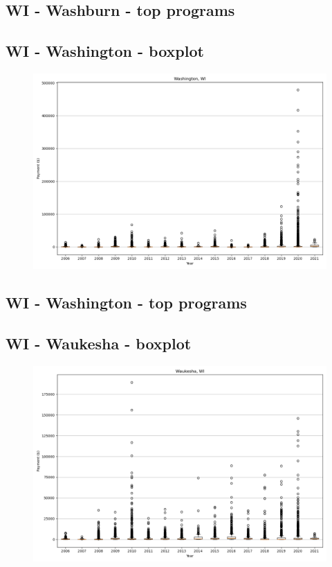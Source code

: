 \subsection*{WI - Washburn - top programs}

\newpage
\subsection*{WI - Washington - boxplot}
\begin{figure}[h]
\centering
\includegraphics[width=7in]{../output/boxplots/counties/Washington-WI_boxplot.png}
\end{figure}


\subsection*{WI - Washington - top programs}

\newpage
\subsection*{WI - Waukesha - boxplot}
\begin{figure}[h]
\centering
\includegraphics[width=7in]{../output/boxplots/counties/Waukesha-WI_boxplot.png}
\end{figure}



